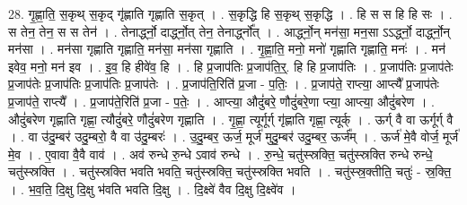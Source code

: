 \documentclass[17pt]{extarticle}
\begin{document}
28. गृ॒ह्णा॒ति॒ स॒कृथ् स॒कृद् गृ॑ह्णाति गृह्णाति स॒कृत् । . स॒कृद्धि हि स॒कृथ् स॒कृद्धि । . हि स स हि हि सः । . स तेन॒ तेन॒ स स तेन॑ । . तेनार्द्ध्नो॒ दार्द्ध्नो॒त् तेन॒ तेनार्द्ध्नो᳚त् । . आर्द्ध्नो॒न् मन॑सा॒ मन॒सा ऽऽर्द्ध्नो॒ दार्द्ध्नो॒न् मन॑सा । . मन॑सा गृह्णाति गृह्णाति॒ मन॑सा॒ मन॑सा गृह्णाति । . गृ॒ह्णा॒ति॒ मनो॒ मनो॑ गृह्णाति गृह्णाति॒ मनः॑ । . मन॑ इवेव॒ मनो॒ मन॑ इव । . इ॒व॒ हि हीवे॑व॒ हि । . हि प्र॒जाप॑तिः प्र॒जाप॑ति॒र्॒. हि हि प्र॒जाप॑तिः । . प्र॒जाप॑तिः प्र॒जाप॑तेः प्र॒जाप॑तेः प्र॒जाप॑तिः प्र॒जाप॑तिः प्र॒जाप॑तेः । . प्र॒जाप॑ति॒रिति॑ प्र॒जा - प॒तिः॒ । . प्र॒जाप॑ते॒ राप्त्या॒ आप्त्यै᳚ प्र॒जाप॑तेः प्र॒जाप॑ते॒ राप्त्यै᳚ । . प्र॒जाप॑ते॒रिति॑ प्र॒जा - प॒तेः॒ । . आप्त्या॒ औदुं॑बरे॒ णौदुं॑बरे॒णा प्त्या॒ आप्त्या॒ औदुं॑बरेण । . औदुं॑बरेण गृह्णाति गृह्णा॒ त्यौदुं॑बरे॒ णौदुं॑बरेण गृह्णाति । . गृ॒ह्णा॒ त्यूर्गूर्ग् गृ॑ह्णाति गृह्णा॒ त्यूर्क् । . ऊर्ग् वै वा ऊर्गूर्ग् वै । . वा उ॑दु॒म्बर॑ उदु॒म्बरो॒ वै वा उ॑दु॒म्बरः॑ । . उ॒दु॒म्बर॒ ऊर्ज॒ मूर्ज॑ मुदु॒म्बर॑ उदु॒म्बर॒ ऊर्ज᳚म् । . ऊर्ज॑ मे॒वै वोर्ज॒ मूर्ज॑ मे॒व । . ए॒वावा वै॒वै वाव॑ । . अव॑ रुन्धे रु॒न्धे ऽवाव॑ रुन्धे । . रु॒न्धे॒ चतु॑स्स्रक्ति॒ चतु॑स्स्रक्ति रुन्धे रुन्धे॒ चतु॑स्स्रक्ति । . चतु॑स्स्रक्ति भवति भवति॒ चतु॑स्स्रक्ति॒ चतु॑स्स्रक्ति भवति । . चतु॑स्स्र॒क्तीति॒ चतुः॑ - स्र॒क्ति॒ । . भ॒व॒ति॒ दि॒क्षु दि॒क्षु भ॑वति भवति दि॒क्षु । . दि॒क्ष्वे॑ वैव दि॒क्षु दि॒क्ष्वे॑व । \newline
\end{document}
